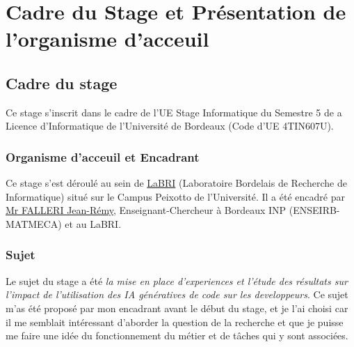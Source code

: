 
\chapter{Cadre du Stage et Présentation de l'organisme d'acceuil} %

\label{Chapter1} %

\section{Cadre du stage}

Ce stage s'inscrit dans le cadre de l'UE Stage Informatique du Semestre 5 de a Licence d'Informatique de l'Université de Bordeaux (Code d'UE 4TIN607U).

\subsection{Organisme d'acceuil et Encadrant}

Ce stage s'est déroulé au sein de \href{https://www.labri.fr/}{LaBRI} (Laboratoire Bordelais de Recherche de Informatique) situé sur le Campus Peixotto de l'Université.
Il a été encadré par \href{https://www.labri.fr/perso/falleri/}{Mr FALLERI Jean-Rémy}, Enseignant-Chercheur à Bordeaux INP (ENSEIRB-MATMECA) et au LaBRI.

\subsection{Sujet}

Le sujet du stage a été \emph{la mise en place d'experiences et l'étude des résultats sur l’impact de l’utilisation des IA génératives de code sur les developpeurs}.
Ce sujet m'as été proposé par mon encadrant avant le début du stage, et je l'ai choisi car il me semblait intéressant d'aborder la question de la recherche et que je puisse me faire une idée du fonctionnement du métier et de tâches qui y sont associées.
